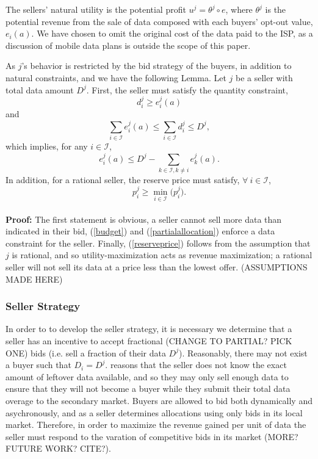 \documentclass[12pt]{article}
\theoremstyle{definition}
\newcommand{\mcI}{\mathcal{I}}
\begin{document}
\begin{multicols}{2}
The sellers' natural utility is the potential
profit $u^j = \theta^j\circ e$, where $\theta^j$ is the
potential revenue from the sale of data composed with each buyers' opt-out value, $e_i(a)$. 
We have chosen to omit the original cost of the data
paid to the ISP, as a discussion of mobile data plans is outside the scope of this
paper.  

As $j$'s behavior is restricted by
the bid strategy of the buyers, in addition to natural constraints, and we have the following Lemma.
{
\label{constraints}
Let $j$ be a seller with total data amount $D^j$.
First, the seller must satisfy the quantity
constraint, 
\begin{equation}\label{quantity}
    d_i^j \ge e_i^j(a)
\end{equation}
and
\begin{equation}\label{budget}
    \displaystyle\sum_{i\in\mcI} e_i^j(a) \le \sum_{i\in\mcI} d^j_i \le D^j,
\end{equation}
which implies, for any $i\in\mcI$,
\begin{equation}\label{partialallocation}
    e_i^j(a) \le D^j - \sum_{k\in\mcI, k\ne i} e_k^j(a).
\end{equation}
In addition, for a rational seller, the reserve price must
satisfy, $\forall \ i\in \mcI$,
\begin{equation}\label{reserveprice}
   p_i^j \ge \min_{i\in\mcI}\big(p_i^j).
\end{equation}
}\\
\textbf{Proof:}
The first statement is obvious, 
a seller cannot sell more data than indicated in their bid, (\ref{budget}) and
(\ref{partialallocation}) enforce
a data constraint for the seller. Finally, (\ref{reserveprice})
follows from the assumption that $j$ is rational, and so utility-maximization
acts as revenue maximization; a rational seller will not sell its
data at a price less than the lowest offer. (ASSUMPTIONS MADE HERE)


\subsubsection{Seller Strategy}
In order to to develop the seller strategy, it is necessary we determine 
that a seller has an incentive to
accept fractional (CHANGE TO PARTIAL? PICK ONE) bids (i.e. sell a fraction of
their data $D^j$). Reasonably,
there may not exist a buyer such that $D_i = D^j$. \cite{zheng} reasons that the seller does not know the exact amount of
leftover data available, and so they may only sell enough data to ensure that
they will not become a buyer while they submit their total data overage to the
secondary market. Buyers are allowed to
bid both dynamically and asychronously, and as a seller determines allocations using only bids
in its local market. Therefore, in order to
maximize the revenue gained per unit of data the seller must respond to the
varation of competitive bids in its market (MORE? FUTURE WORK? CITE?).


\end{multicols}
\end{document}
